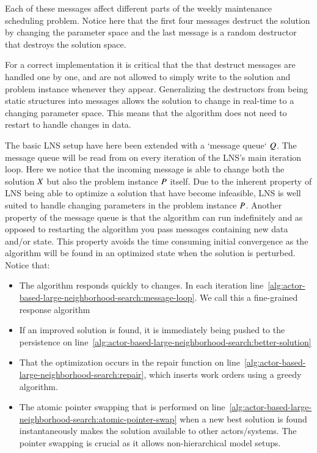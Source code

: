 Each of these messages affect different parts of the weekly maintenance
scheduling  problem. Notice here that the first four messages destruct the
solution by changing the parameter space and the last message is a random
destructor that destroys the solution space.

For a correct implementation it is critical that the that destruct messages
are  handled one by one, and are not allowed to simply write to the solution and
problem instance whenever they appear. Generalizing the destructors from being
static structures into messages allows the solution to change in real-time to a
changing parameter space. This means that the algorithm does not need to restart
to handle changes in data.



The basic LNS setup have here been extended with a `message queue` $
Q$. The message queue will be read from on every iteration of
the LNS's main iteration loop. Here we notice that the incoming message is
able to change both the solution $X$ but also the problem instance $
P$ itself. Due to the inherent property of LNS being able to
optimize a solution that have become infeasible, LNS is well suited to handle
changing parameters  in the problem instance $P$. Another
property of the message queue is  that the algorithm can run indefinitely and
as opposed to restarting the algorithm you pass messages containing new data
and/or state. This property avoids the time consuming initial convergence as the
algorithm will be found in an optimized state when the solution is perturbed.
Notice that:

\begin{itemize}
    \item The algorithm responds quickly to changes. In each iteration
		line~\ref{alg:actor-based-large-neighborhood-search:message-loop}. We
		call this a fine-grained response algorithm     
	\item If an improved
		solution is found, it is immediately being pushed to the persistence
		on line~\ref{alg:actor-based-large-neighborhood-search:better-solution}
	\item That the optimization occurs in the repair function on
		line~\ref{alg:actor-based-large-neighborhood-search:repair},
		which inserts work orders using a greedy algorithm.  	
	\item The atomic pointer swapping that is performed on
		line~\ref{alg:actor-based-large-neighborhood-search:atomic-pointer-swap} when a
		new best solution is found instantaneously makes the solution available to other
		actors/systems. The pointer swapping is crucial as it allows non-hierarchical
		model setups.
\end{itemize}

